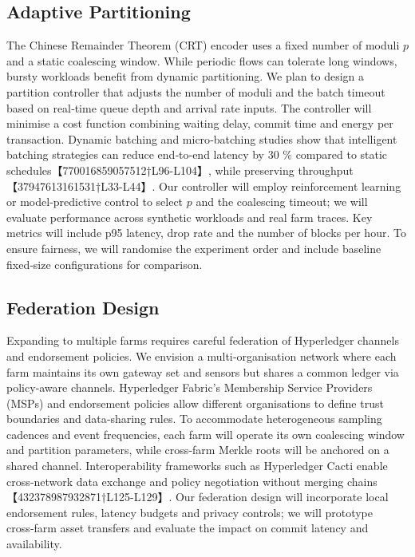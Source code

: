 \documentclass[12pt,onecolumn]{IEEEtran} %
\begin{document}
\subsection{Adaptive Partitioning}
The Chinese Remainder Theorem (CRT) encoder uses a fixed number of moduli \(p\) and a
static coalescing window.  While periodic flows can tolerate long windows, bursty workloads
benefit from dynamic partitioning.  We plan to design a partition controller that adjusts
the number of moduli and the batch timeout based on real‑time queue depth and arrival rate
inputs.  The controller will minimise a cost function combining waiting delay, commit time
and energy per transaction.  Dynamic batching and micro‑batching studies show that
intelligent batching strategies can reduce end‑to‑end latency by 30 \% compared to static
schedules【770016859057512†L96-L104】, while preserving throughput【37947613161531†L33-L44】.
Our controller will employ reinforcement learning or model‑predictive control to select
\(p\) and the coalescing timeout; we will evaluate performance across synthetic workloads and
real farm traces.  Key metrics will include p95 latency, drop rate and the number of blocks
per hour.  To ensure fairness, we will randomise the experiment order and include baseline
fixed‑size configurations for comparison.

\subsection{Federation Design}
Expanding to multiple farms requires careful federation of Hyperledger channels and
endorsement policies.  We envision a multi‑organisation network where each farm maintains
its own gateway set and sensors but shares a common ledger via policy‑aware channels.
Hyperledger Fabric’s Membership Service Providers (MSPs) and endorsement policies allow
different organisations to define trust boundaries and data‑sharing rules.  To accommodate
heterogeneous sampling cadences and event frequencies, each farm will operate its own
coalescing window and partition parameters, while cross‑farm Merkle roots will be anchored
on a shared channel.  Interoperability frameworks such as Hyperledger Cacti enable
cross‑network data exchange and policy negotiation without merging chains【432378987932871†L125-L129】.
Our federation design will incorporate local endorsement rules, latency budgets and
privacy controls; we will prototype cross‑farm asset transfers and evaluate the impact on
commit latency and availability.
\end{document}
